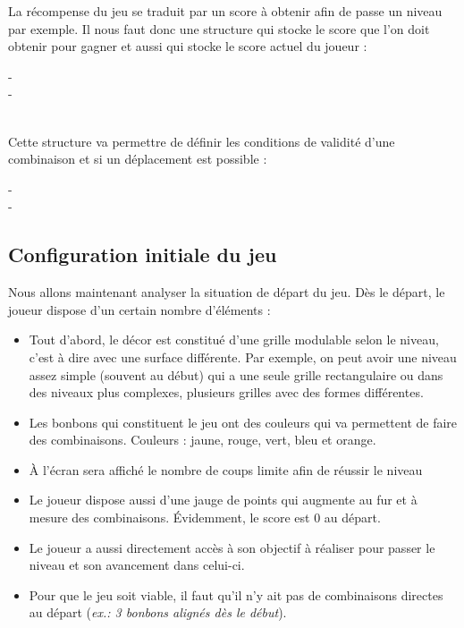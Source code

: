   La récompense du jeu se traduit par un score à obtenir afin de passe un niveau par exemple.
  Il nous faut donc une structure qui stocke le score que l'on doit obtenir pour gagner et aussi qui stocke le score actuel du joueur : \\
  
  \begin{typeag}[Score]
 -       \\
 -       
  \end{typeag}	\\
  
  Cette structure va permettre de définir les conditions de validité d'une combinaison et si un déplacement est possible : \\
  
\begin{typeag}[Case]
 -       \\
 -       
  \end{typeag}

\subsection{Configuration initiale du jeu}
Nous allons maintenant analyser la situation de départ du jeu. Dès le départ, le joueur dispose d'un certain nombre d'éléments : \\

\begin{itemize}

\item
	Tout d'abord, le décor est constitué d'une grille modulable selon le niveau, c'est à dire avec une surface différente.
	Par exemple, on peut avoir une niveau assez simple (souvent au début) qui a une seule grille rectangulaire ou dans des niveaux plus complexes, plusieurs grilles avec des formes différentes.
\item
	Les bonbons qui constituent le jeu ont des couleurs qui va permettent de faire des combinaisons.
	Couleurs : jaune, rouge, vert, bleu et orange.
\item
	À l'écran sera affiché le nombre de coups limite afin de réussir le niveau %
\item
	Le joueur dispose aussi d'une jauge de points qui augmente au fur et à mesure des combinaisons.
	Évidemment, le score est 0 au départ.
\item
	Le joueur a aussi directement accès à son objectif à réaliser pour passer le niveau et son avancement dans celui-ci.
\item 
 	Pour que le jeu soit viable, il faut qu'il n'y ait pas de combinaisons directes au départ (\emph{ex.: 3 bonbons alignés dès le début}). %
	
\end{itemize}

